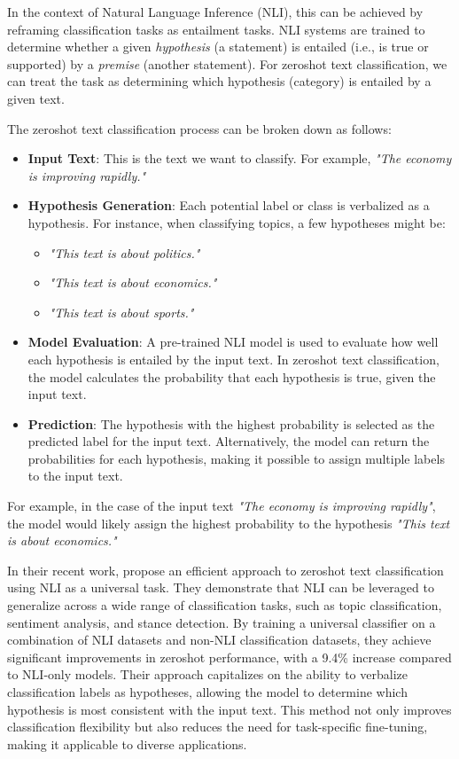 In the context of Natural Language Inference (NLI), this can be achieved by reframing classification tasks as entailment tasks. NLI systems are trained to determine whether a given \textit{hypothesis} (a statement) is entailed (i.e., is true or supported) by a \textit{premise} (another statement). For zeroshot text classification, we can treat the task as determining which hypothesis (category) is entailed by a given text.

The zeroshot text classification process can be broken down as follows:
\begin{itemize}
    \item \textbf{Input Text}: This is the text we want to classify. For example, \textit{"The economy is improving rapidly."}
    
    \item \textbf{Hypothesis Generation}: Each potential label or class is verbalized as a hypothesis. For instance, when classifying topics, a few hypotheses might be:
    \begin{itemize}
        \item \textit{"This text is about politics."}
        \item \textit{"This text is about economics."}
        \item \textit{"This text is about sports."}
    \end{itemize}
    
    \item \textbf{Model Evaluation}: A pre-trained NLI model is used to evaluate how well each hypothesis is entailed by the input text. In zeroshot text classification, the model calculates the probability that each hypothesis is true, given the input text.
    
    \item \textbf{Prediction}: The hypothesis with the highest probability is selected as the predicted label for the input text. Alternatively, the model can return the probabilities for each hypothesis, making it possible to assign multiple labels to the input text.
\end{itemize}

For example, in the case of the input text \textit{"The economy is improving rapidly"}, the model would likely assign the highest probability to the hypothesis \textit{"This text is about economics."}

In their recent work, \citet{laurer_building_2024} propose an efficient approach to zeroshot text classification using NLI as a universal task. They demonstrate that NLI can be leveraged to generalize across a wide range of classification tasks, such as topic classification, sentiment analysis, and stance detection. By training a universal classifier on a combination of NLI datasets and non-NLI classification datasets, they achieve significant improvements in zeroshot performance, with a 9.4\% increase compared to NLI-only models. Their approach capitalizes on the ability to verbalize classification labels as hypotheses, allowing the model to determine which hypothesis is most consistent with the input text. This method not only improves classification flexibility but also reduces the need for task-specific fine-tuning, making it applicable to diverse applications.

